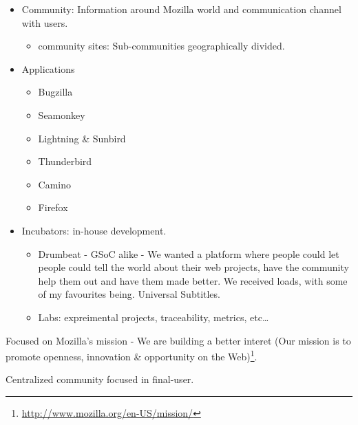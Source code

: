 \documentclass[11pt]{scrartcl}
\begin{document}
\begin{itemize}
	\item Community: Information around Mozilla world and communication channel with users.
        \begin{itemize}
        	\item community sites: Sub-communities geographically divided.
        \end{itemize}
	\item Applications
        \begin{itemize}
        	\item Bugzilla
        	\item Seamonkey
        	\item Lightning \& Sunbird
        	\item Thunderbird
        	\item Camino
        	\item Firefox
        \end{itemize}        
	\item Incubators: in-house development.
        \begin{itemize}
        	\item Drumbeat - GSoC alike - We wanted a platform where people could let people could tell the world about their web projects, have the community help them out and have them made better. We received loads, with some of my favourites being. Universal Subtitles.
        	\item Labs: expreimental projects, traceability, metrics, etc\ldots
        \end{itemize}
\end{itemize}
    
\par Focused on Mozilla's mission - We are building a better interet (Our mission is to promote openness, innovation \& opportunity on the Web)\footnote{\url{http://www.mozilla.org/en-US/mission/}}.

\par Centralized community focused in final-user.

\end{document}
